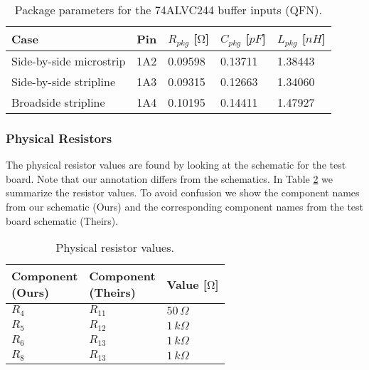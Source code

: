 \documentclass[../main.tex]{subfiles}
\begin{document}
\begin{table}[h]
    \centering
    \begin{tabular}{l|l l l l}
        \toprule[1pt]
        \textbf{Case} & \textbf{Pin} & $R_{pkg}$ [$\si{\ohm}$] & $C_{pkg}$ [$\si{pF}$] & $L_{pkg}$ [$\si{nH}$] \\
        \midrule
        Side-by-side microstrip & 1A2 & 0.09598 & 0.13711 & 1.38443 \\
        Side-by-side stripline  & 1A3 & 0.09315 & 0.12663 & 1.34060 \\
        Broadside stripline     & 1A4 & 0.10195 & 0.14411 & 1.47927 \\
        \bottomrule[1pt]
    \end{tabular}
    \caption{Package parameters for the 74ALVC244 buffer inputs (QFN).}
    \label{tab:pkg-params2}
\end{table}

\subsubsection{Physical Resistors}

The physical resistor values are found by looking at the schematic for the test board. Note that our annotation differs from the schematics. In Table \ref{tab:resistor-params} we summarize the resistor values. To avoid confusion we show the component names from our schematic (Ours) and the corresponding component names from the test board schematic (Theirs).


\begin{table}[h]
    \centering
    \begin{tabular}{l l l}
        \toprule[1pt]
        \makecell[l]{\textbf{Component} \\ \textbf{(Ours)}} & 
        \makecell[l]{\textbf{Component} \\ \textbf{(Theirs)}} &  
        \textbf{Value [$\si{\ohm}$]} \\
        \midrule
        $R_4$ & $R_{11}$ & $50\,\si{\Omega}$  \\
        $R_5$ & $R_{12}$ & $1\,\si{k\Omega}$  \\
        $R_6$ & $R_{13}$ & $1\,\si{k\Omega}$  \\
        $R_8$ & $R_{13}$ & $1\,\si{k\Omega}$  \\
        \bottomrule[1pt]
    \end{tabular}
    \caption{Physical resistor values.}
    \label{tab:resistor-params}
\end{table}
\end{document}
